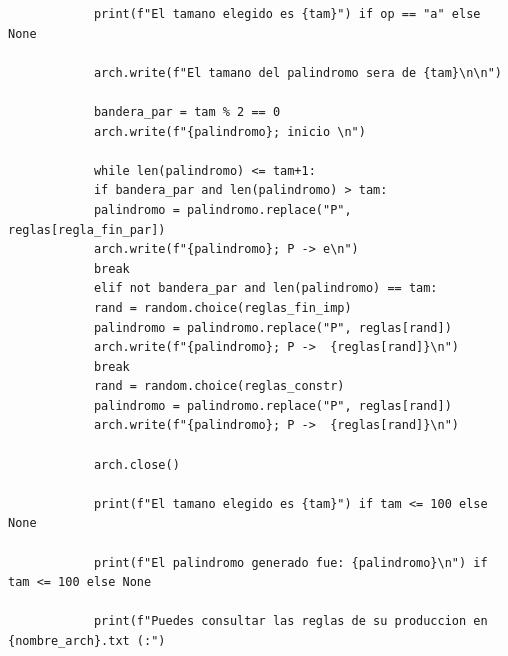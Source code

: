 \documentclass[11pt]{article} %
\begin{document}
\begin{lstlisting}
			print(f"El tamano elegido es {tam}") if op == "a" else None
			
			arch.write(f"El tamano del palindromo sera de {tam}\n\n")
			
			bandera_par = tam % 2 == 0
			arch.write(f"{palindromo}; inicio \n")
			
			while len(palindromo) <= tam+1:
			if bandera_par and len(palindromo) > tam:
			palindromo = palindromo.replace("P", reglas[regla_fin_par])
			arch.write(f"{palindromo}; P -> e\n")
			break
			elif not bandera_par and len(palindromo) == tam:
			rand = random.choice(reglas_fin_imp)
			palindromo = palindromo.replace("P", reglas[rand])
			arch.write(f"{palindromo}; P ->  {reglas[rand]}\n")
			break
			rand = random.choice(reglas_constr)
			palindromo = palindromo.replace("P", reglas[rand])
			arch.write(f"{palindromo}; P ->  {reglas[rand]}\n")
			
			arch.close()
		
			print(f"El tamano elegido es {tam}") if tam <= 100 else None
			
			print(f"El palindromo generado fue: {palindromo}\n") if tam <= 100 else None
			
			print(f"Puedes consultar las reglas de su produccion en {nombre_arch}.txt (:")
		
		
	\end{lstlisting}
	
	
	
\end{document}

